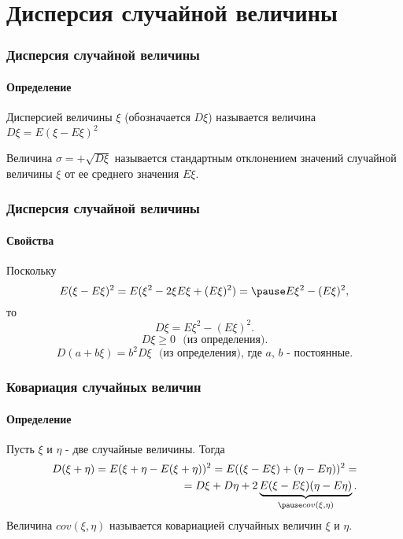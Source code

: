 \section{Дисперсия случайной величины}

\begin{frame}
\frametitle{Дисперсия случайной величины}
\framesubtitle{Определение}
\theoremstyle{definition}
\begin{definition}{Дисперсией}
 величины $\xi$ (обозначается $D \xi$) называется величина
    $D\xi = E (\xi - E \xi)^2$
\end{definition}
\pause
\begin{definition}{}
Величина $\sigma = + \sqrt{ D\xi}$ называется стандартным отклонением значений
случайной величины $\xi$ от ее среднего значения $E\xi$.
\end{definition}
\end{frame}

\begin{frame}
\frametitle{Дисперсия случайной величины}
\framesubtitle{Свойства}
Поскольку
\begin{equation*}
    E(\xi - E\xi)^2 = E(\xi^2 - 2 \xi E\xi + (E \xi)^2 ) = \pause
    E\xi^2 - (E\xi) ^2 ,
\end{equation*}
\pause
то
\begin{equation*}
    \boxed{D \xi= E\xi^2 - (E\xi) ^2}.
\end{equation*}
\pause
\begin{equation*}
    \boxed{D \xi \geq 0}~~~\text{(из определения).}
\end{equation*}
\pause
\begin{equation*}
    \boxed{D (a+b\xi) =b^2 D\xi  }~~~\text{(из определения), где $a$, $b$ -  постоянные.}
\end{equation*}
\end{frame}

\begin{frame}
\frametitle{Ковариация случайных величин}
\framesubtitle{Определение}
Пусть $\xi$ и $\eta$ - две случайные величины. Тогда
\pause
\begin{eqnarray*}
    D(\xi + \eta) = E( \xi + \eta - E (\xi +  \eta ))^2 = 
    E( ( \xi - E \xi) + (\eta -  E \eta ) )^2 = \\
    = D  \xi + D \eta + 2
    \underbrace{
    E( \xi - E \xi)( \eta - E \eta)}_{ \pause cov (\xi, \eta) }.
\end{eqnarray*}
Величина $cov (\xi, \eta)$ называется ковариацией случайных величин $\xi$ и $\eta$.
\end{frame}

